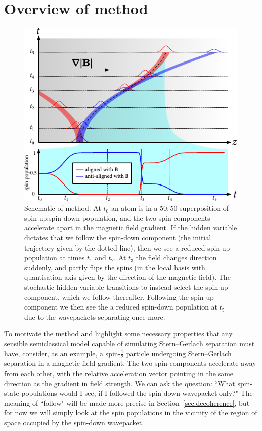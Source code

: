 \section{Overview of method}\label{sec:overview_of_method}

\begin{figure}[t]
    \centerfloat
    \includegraphics{figures/hidden_variables/schematic.pdf}
    \caption{Schematic of method. At $t_0$ an atom is in a $50:50$ superposition of spin-up:spin-down population, and the two spin components accelerate apart in the magnetic field gradient. If the hidden variable dictates that we follow the spin-down component (the initial trajectory given by the dotted line), then we see a reduced spin-up population at times $t_1$ and $t_2$. At $t_3$ the field changes direction suddenly, and partly flips the spins (in the local basis with quantisation axis given by the direction of the magnetic field). The stochastic hidden variable transitions to instead select the spin-up component, which we follow thereafter. Following the spin-up component we then see the a reduced spin-down population at $t_5$ due to the wavepackets separating once more.}\label{fig:HVSC_schematic}
\end{figure}

To motivate the method and highlight some necessary properties that any sensible semiclassical model capable of simulating Stern--Gerlach separation must have, consider, as an example, a spin-$\frac12$ particle undergoing Stern--Gerlach separation in a magnetic field gradient. The two spin components accelerate away from each other, with the relative acceleration vector pointing in the same direction as the gradient in field strength. We can ask the question: ``What spin-state populations would I see, if I followed the spin-down wavepacket only?" The meaning of ``follow" will be made more precise in Section~\ref{sec:decoherence}, but for now we will simply look at the spin populations in the vicinity of the region of space occupied by the spin-down wavepacket.

